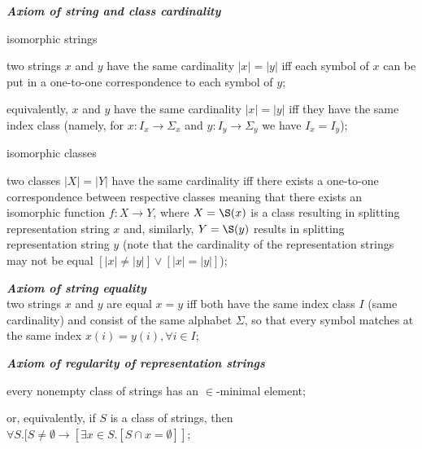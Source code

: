 \begin{definition}
\begin{legal}
\begin{legal}
    \end{legal}
    \item \textbf{\textit{Axiom of string and class cardinality}}
    \begin{legal}
      \item isomorphic strings
      \begin{legal}
        \item two strings $x$ and $y$ have the same cardinality $|x| = |y|$ iff each symbol of $x$ can be put in a one-to-one correspondence to each symbol of $y$;
        \item equivalently, $x$ and $y$ have the same cardinality $|x| = |y|$ iff they have the same index class (namely, for $x: I_x \to \Sigma_x$ and $y: I_y \to \Sigma_y$ we have $I_x = I_y$);
      \end{legal}
      \item isomorphic classes
      \begin{legal}
        \item two classes $|X| = |Y|$ have the same cardinality iff there exists a one-to-one correspondence between respective classes meaning that there exists an isomorphic function $f: X \to Y$, where $X = \S(x)$ is a class resulting in splitting representation string $x$ and, similarly, $Y = \S(y)$ results in splitting representation string $y$ (note that the cardinality of the representation strings may not be equal $[|x| \ne |y|] \lor [|x| = |y|]$);
      \end{legal}
    \end{legal}
    \item \textbf{\textit{Axiom of string equality}}\\
    two strings $x$ and $y$ are equal $x = y$ iff both have the same index class $I$ (same cardinality) and consist of the same alphabet $\Sigma$, so that every symbol matches at the same index $x(i) = y(i), \forall i \in I$;
    \item \textbf{\textit{Axiom of regularity of representation strings}}
    \begin{legal}
      \item every nonempty class of strings has an $\in$-minimal element;
      \item or, equivalently, if $S$ is a class of strings, then $\forall S.[S \ne \emptyset \rightarrow [\exists x \in S.[S \cap x = \emptyset]]$;

\end{legal}
\end{legal}
\end{definition}

